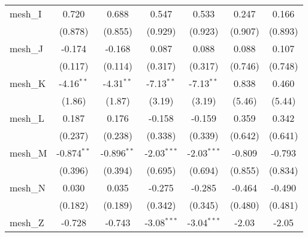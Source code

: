 \begin{tabular}{lcccccc}
   mesh\_I                                                     & 0.720          & 0.688          & 0.547          & 0.533          & 0.247          & 0.166\\   
                                                               & (0.878)        & (0.855)        & (0.929)        & (0.923)        & (0.907)        & (0.893)\\   
   mesh\_J                                                     & -0.174         & -0.168         & 0.087          & 0.088          & 0.088          & 0.107\\   
                                                               & (0.117)        & (0.114)        & (0.317)        & (0.317)        & (0.746)        & (0.748)\\   
   mesh\_K                                                     & -4.16$^{**}$   & -4.31$^{**}$   & -7.13$^{**}$   & -7.13$^{**}$   & 0.838          & 0.460\\   
                                                               & (1.86)         & (1.87)         & (3.19)         & (3.19)         & (5.46)         & (5.44)\\   
   mesh\_L                                                     & 0.187          & 0.176          & -0.158         & -0.159         & 0.359          & 0.342\\   
                                                               & (0.237)        & (0.238)        & (0.338)        & (0.339)        & (0.642)        & (0.641)\\   
   mesh\_M                                                     & -0.874$^{**}$  & -0.896$^{**}$  & -2.03$^{***}$  & -2.03$^{***}$  & -0.809         & -0.793\\   
                                                               & (0.396)        & (0.394)        & (0.695)        & (0.694)        & (0.855)        & (0.834)\\   
   mesh\_N                                                     & 0.030          & 0.035          & -0.275         & -0.285         & -0.464         & -0.490\\   
                                                               & (0.182)        & (0.189)        & (0.342)        & (0.345)        & (0.480)        & (0.481)\\   
   mesh\_Z                                                     & -0.728         & -0.743         & -3.08$^{***}$  & -3.04$^{***}$  & -2.03          & -2.05\\   

\end{tabular}

